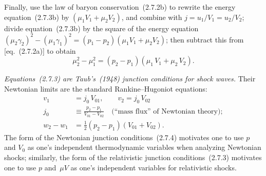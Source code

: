 Finally, use the law of baryon conservation~(2.7.2b) to rewrite the energy
equation~(2.7.3b) by $(\mu_1 V_1 + \mu_2 V_2)$, and combine with
$j = u_1/V_1 = u_2/V_2$; divide equation~(2.7.3b) by the square of the energy
equation $(\mu_2\gamma_2)^2 - (\mu_1\gamma_1)^2 = (p_1 - p_2)(\mu_1 V_1 + \mu_2 V_2)$;
then subtract this from [eq.~(2.7.2a)] to obtain
%
\begin{equation}
\tag{2.7.3c}
\mu_2^2 - \mu_1^2 = (p_2 - p_1)(\mu_1\,V_1 + \mu_2\,V_2).
\end{equation}

\emph{Equations~(2.7.3) are Taub's~(1948) junction conditions for shock waves.}
Their Newtonian limits are the standard Rankine--Hugoniot equations:
%
\begin{subequations}
\begin{align}
\tag{2.7.4a}
v_1 &= j_0\,V_{01},\qquad v_2 = j_0\,V_{02}\\[4pt]
\tag{2.7.4b}
j_0 &\equiv \frac{p_2 - p_1}{V_{01} - V_{02}}\quad
\text{(``mass flux'' of Newtonian theory)};\\[4pt]
\tag{2.7.4c}
w_2 - w_1 &= \tfrac{1}{2}(p_2 - p_1)(V_{01} + V_{02}).
\end{align}
\end{subequations}
%
The form of the Newtonian junction conditions~(2.7.4) motivates one to use $p$
and $V_0$ as one's independent thermodynamic variables when analyzing Newtonian
shocks; similarly, the form of the relativistic junction conditions~(2.7.3)
motivates one to use $p$ and~$\mu V$ as one's independent variables for
relativistic shocks.
